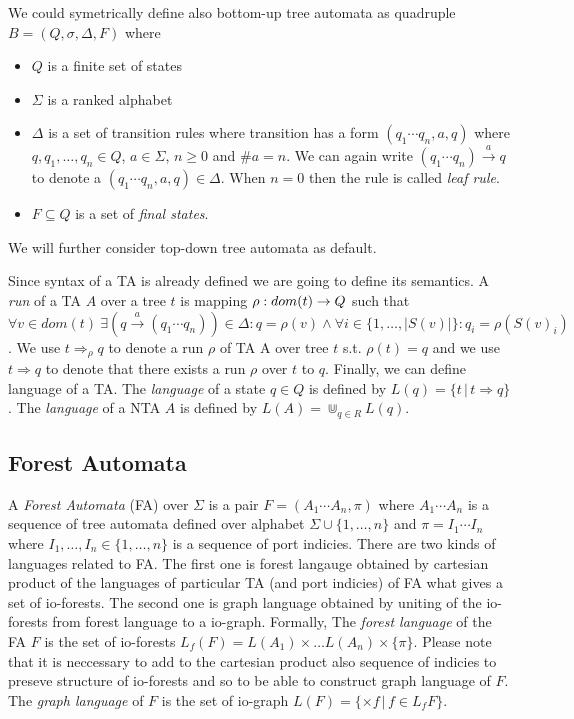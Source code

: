 We could symetrically define also bottom-up tree automata as quadruple $B = (Q, \sigma, \Delta, F)$ where
\begin{itemize}
	\item $Q$ is a finite set of states
	\item $\Sigma$ is a ranked alphabet
	\item $\Delta$ is a set of transition rules where transition has a form $(q_1 \cdots q_n,a,q)$ where $q,q_1,\ldots,q_n \in Q$, $a \in \Sigma$, $n \geq 0$ and $\#a = n$.
		We can again write $(q_1 \cdots q_n) \xrightarrow{a} q$ to denote a $(q_1 \cdots q_n,a,q) \in \Delta$.
		When $n=0$ then the rule is called \emph{leaf rule}.
	\item $F \subseteq Q$ is a set of \emph{final states}.
\end{itemize}

We will further consider top-down tree automata as default.

Since syntax of a TA is already defined we are going to define its semantics.
A \emph{run} of a TA $A$ over a tree $t$ is mapping $\rho: dom(t) \rightarrow Q$ such that
$\forall v \in dom(t)\ \exists (q \xrightarrow{a} (q_1 \cdots q_n)) \in \Delta:  q=\rho(v) \wedge  \forall i \in \{1, \ldots, |S(v)|\}: q_i=\rho(S(v)_i)$.
We use $t \Rightarrow_{\rho} q$ to denote a run $\rho$ of TA A over tree $t$ s.t. $\rho(t) = q$ and we use $t \Rightarrow q$ to denote that there exists
a run $\rho$ over $t$ to $q$.
Finally, we can define language of a TA.
The \emph{language} of a state $q\in Q$ is defined by $L(q) = \{t\,|\, t \Rightarrow q\}$.
The \emph{language} of a NTA $A$ is defined by $L(A) = \Cup_{q\in R} L(q)$.

\subsection{Forest Automata}
\label{subsec:fa}

A \emph{Forest Automata} (FA) over $\Sigma$ is a pair $F=(A_1\cdots A_n, \pi)$
where $A_1 \cdots A_n$ is a sequence of tree automata defined over alphabet $\Sigma \cup \{1,\ldots,n\}$
and $\pi = I_1 \cdots I_n$ where $I_1,\ldots, I_n \in \{1, \ldots, n\}$ is a sequence of port indicies.
There are two kinds of languages related to FA.
The first one is forest langauge obtained by cartesian product of the languages of particular TA (and port indicies) of FA
what gives a set of io-forests.
The second one is graph language obtained by uniting of the io-forests from forest language to a io-graph.
Formally, The \emph{forest language} of the FA $F$ is the set of io-forests $L_f(F)= L(A_1) \times \ldots L(A_n) \times \{\pi\}$.
Please note that it is neccessary to add to the cartesian product also sequence of indicies to preseve structure of io-forests
and so to be able to construct graph language of $F$.
The \emph{graph language} of $F$ is the set of io-graph $L(F) = \{\times f\,|\, f \in L_f{F}\}$.

